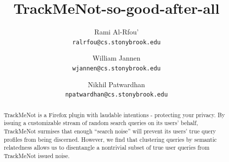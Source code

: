 \documentclass{llncs}
\title{TrackMeNot-so-good-after-all}
\author{Rami Al-Rfou' \\{\texttt{ralrfou@cs.stonybrook.edu}}
\and William Jannen \\{\texttt{wjannen@cs.stonybrook.edu}}
\and Nikhil Patwardhan \\{\texttt{npatwardhan@cs.stonybrook.edu}}
}
\begin{document}
\maketitle

\pagestyle{headings}

\begin{abstract}
  TrackMeNot is a Firefox plugin with laudable intentions - protecting
  your privacy. By issuing a customizable stream of random search
  queries on its users' behalf, TrackMeNot surmises that enough
  ``search noise'' will prevent its users' true query profiles from
  being discerned. However, we find that clustering queries by
  semantic relatedness allows us to disentangle a nontrivial subset of
  true user queries from TrackMeNot issued noise.
\end{abstract}
\end{document}
